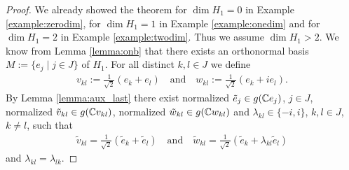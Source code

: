 \begin{proof}
	We already showed the theorem for $\dim H_1 = 0$ in Example \ref{example:zerodim}, for $\dim H_1 = 1$ in Example \ref{example:onedim} and for $\dim H_1 = 2$ in Example \ref{example:twodim}. Thus we assume $\dim H_1 > 2$. We know from Lemma \ref{lemma:onb} that there exists an orthonormal basis $M := \{e_j \mid j \in J\}$ of $H_1$. For all distinct $k,l \in J$ we define
	\begin{align*}
		v_{kl} := \frac{1}{\sqrt{2}}(e_k + e_l) \quad \text{and} \quad w_{kl} := \frac{1}{\sqrt{2}}(e_k + ie_l).
	\end{align*}
	 By Lemma \ref{lemma:aux_last} there exist normalized $\tilde{e}_j \in g(\mathbb{C} e_j)$, $j \in J$, normalized $\tilde{v}_{kl} \in g(\mathbb{C} v_{kl})$, normalized $\tilde{w}_{kl} \in g(\mathbb{C} w_{kl})$ and $\lambda_{kl} \in \{-i, i\}$, $k,l \in J$, $k \neq l$, such that 
	 \begin{align*}
	 \tilde{v}_{kl} = \frac{1}{\sqrt{2}}(\tilde{e}_k + \tilde{e}_l) \quad \text{and} \quad \tilde{w}_{kl} = \frac{1}{\sqrt{2}}(\tilde{e}_k + \lambda_{kl} \tilde{e}_l)
	 \end{align*}
	 and $\lambda_{kl} = \lambda_{lk}$. 
	 

\end{proof}
